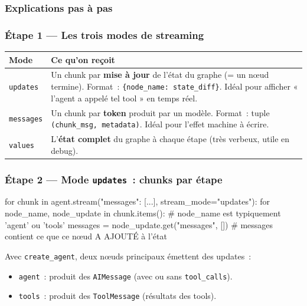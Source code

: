 \documentclass[11pt,a4paper]{article}
\begin{document}
\subsubsection{Explications pas à pas}

\subsubsection*{Étape 1 — Les trois modes de streaming}

\begin{center}
\begin{tabular}{p{2.5cm} p{11.5cm}}
\toprule
\textbf{Mode} & \textbf{Ce qu'on reçoit} \\
\midrule
\texttt{updates}
& Un chunk par \textbf{mise à jour} de l'état du graphe (= un nœud
termine). Format~: \texttt{\{node\_name: state\_diff\}}. Idéal pour
afficher « l'agent a appelé tel tool » en temps réel. \\[1mm]
\texttt{messages}
& Un chunk par \textbf{token} produit par un modèle. Format~: tuple
\texttt{(chunk\_msg, metadata)}. Idéal pour l'effet machine à écrire. \\[1mm]
\texttt{values}
& L'\textbf{état complet} du graphe à chaque étape (très verbeux, utile
en debug). \\
\bottomrule
\end{tabular}
\end{center}

\subsubsection*{Étape 2 — Mode \texttt{updates}~: chunks par étape}

\begin{pythoncode}
for chunk in agent.stream({"messages": [...]}, stream_mode="updates"):
    for node_name, node_update in chunk.items():
        # node_name est typiquement 'agent' ou 'tools'
        messages = node_update.get("messages", [])
        # messages contient ce que ce nœud A AJOUTÉ à l'état
\end{pythoncode}

Avec \texttt{create\_agent}, deux nœuds principaux émettent des updates~:
\begin{itemize}[leftmargin=*]
  \item \texttt{agent}~: produit des \texttt{AIMessage} (avec ou sans
        \texttt{tool\_calls}).
  \item \texttt{tools}~: produit des \texttt{ToolMessage} (résultats des
        tools).
\end{itemize}
\end{document}
